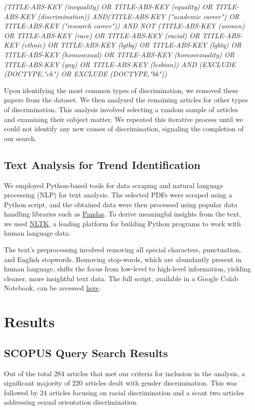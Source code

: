 \documentclass[runningheads]{llncs}
\begin{document}
\textit{(TITLE-ABS-KEY (inequality) OR TITLE-ABS-KEY (equality) OR TITLE-ABS-KEY (discrimination)) AND(TITLE-ABS-KEY ("academic career") OR TITLE-ABS-KEY ("research career")) AND NOT 
(TITLE-ABS-KEY (women) OR TITLE-ABS-KEY (race) OR TITLE-ABS-KEY (racial) OR TITLE-ABS-KEY (ethnic) OR TITLE-ABS-KEY (lgtbq) OR TITLE-ABS-KEY (lgbtq) OR TITLE-ABS-KEY (homosexual) OR TITLE-ABS-KEY (homosexuality) OR TITLE-ABS-KEY (gay) OR TITLE-ABS-KEY (lesbian)) AND 
(EXCLUDE (DOCTYPE,"ch") OR EXCLUDE (DOCTYPE,"bk"))}

Upon identifying the most common types of discrimination, we removed these papers from the dataset. We then analyzed the remaining articles for other types of discrimination. This analysis involved selecting a random sample of articles and examining their subject matter. We repeated this iterative process until we could not identify any new causes of discrimination, signaling the completion of our search.

\subsection{Text Analysis for Trend Identification}
We employed Python-based tools for data scraping and natural language processing (NLP) for text analysis. The selected PDFs were scraped using a Python script, and the obtained data were then processed using popular data handling libraries such as \href{https://pandas.pydata.org/}{Pandas}. To derive meaningful insights from the text, we used \href{https://www.nltk.org/}{NLTK}, a leading platform for building Python programs to work with human language data.

The text's preprocessing involved removing all special characters, punctuation, and English stopwords. Removing stop-words, which are abundantly present in human language, shifts the focus from low-level to high-level information, yielding cleaner, more insightful text data. The full script, available in a Google Colab Notebook, can be accessed \href{https://colab.research.google.com/drive/1IjIltXAYM-fAM2dUuPyqpsezf4HZf19G?usp=sharing}{here}.

\section{Results}
\subsection{SCOPUS Query Search Results}
Out of the total 284 articles that met our criteria for inclusion in the analysis, a significant majority of 220 articles dealt with gender discrimination. This was followed by 24 articles focusing on racial discrimination and a scant two articles addressing sexual orientation discrimination.
\end{document}

